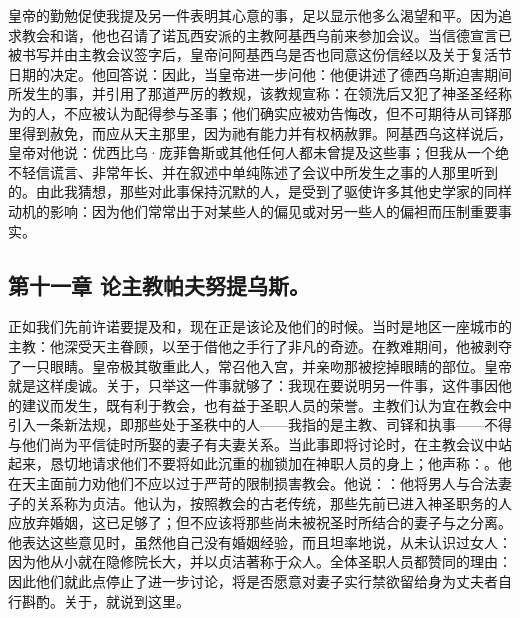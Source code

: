 皇帝的勤勉促使我提及另一件表明其心意的事，足以显示他多么渴望和平。因为追求教会和谐，他也召请了诺瓦西安派的主教阿基西乌前来参加会议。当信德宣言已被书写并由主教会议签字后，皇帝问阿基西乌是否也同意这份信经以及关于复活节日期的决定。他回答说：因此，当皇帝进一步问他：他便讲述了德西乌斯迫害期间所发生的事，并引用了那道严厉的教规，该教规宣称：在领洗后又犯了神圣圣经称为的人，不应被认为配得参与圣事；他们确实应被劝告悔改，但不可期待从司铎那里得到赦免，而应从天主那里，因为祂有能力并有权柄赦罪。阿基西乌这样说后，皇帝对他说：优西比乌·庞菲鲁斯或其他任何人都未曾提及这些事；但我从一个绝不轻信谎言、非常年长、并在叙述中单纯陈述了会议中所发生之事的人那里听到的。由此我猜想，那些对此事保持沉默的人，是受到了驱使许多其他史学家的同样动机的影响：因为他们常常出于对某些人的偏见或对另一些人的偏袒而压制重要事实。\par


\subsection{第十一章 论主教帕夫努提乌斯。}

正如我们先前许诺要提及和，现在正是该论及他们的时候。当时是地区一座城市的主教：他深受天主眷顾，以至于借他之手行了非凡的奇迹。在教难期间，他被剥夺了一只眼睛。皇帝极其敬重此人，常召他入宫，并亲吻那被挖掉眼睛的部位。皇帝就是这样虔诚。关于，只举这一件事就够了：我现在要说明另一件事，这件事因他的建议而发生，既有利于教会，也有益于圣职人员的荣誉。主教们认为宜在教会中引入一条新法规，即那些处于圣秩中的人——我指的是主教、司铎和执事——不得与他们尚为平信徒时所娶的妻子有夫妻关系。当此事即将讨论时，在主教会议中站起来，恳切地请求他们不要将如此沉重的枷锁加在神职人员的身上；他声称：。他在天主面前力劝他们不应以过于严苛的限制损害教会。他说：：他将男人与合法妻子的关系称为贞洁。他认为，按照教会的古老传统，那些先前已进入神圣职务的人应放弃婚姻，这已足够了；但不应该将那些尚未被祝圣时所结合的妻子与之分离。他表达这些意见时，虽然他自己没有婚姻经验，而且坦率地说，从未认识过女人：因为他从小就在隐修院长大，并以贞洁著称于众人。全体圣职人员都赞同的理由：因此他们就此点停止了进一步讨论，将是否愿意对妻子实行禁欲留给身为丈夫者自行斟酌。关于，就说到这里。\par

